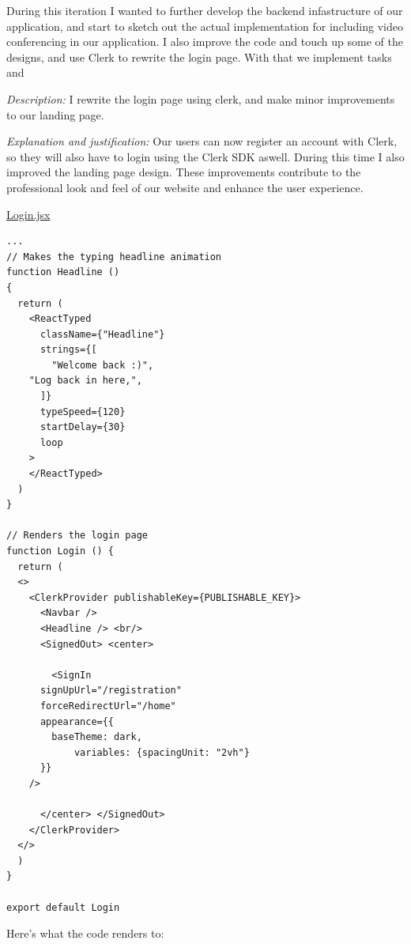 During this iteration I wanted to further develop the backend
infastructure of our application, and start to sketch out the
actual implementation for including video conferencing in our
application. I also improve the code and touch up some of the
designs, and use Clerk to rewrite the login page. With that
we implement tasks  and  \\ \vspace{0.2cm}

\textit{Description:} I rewrite the login page using clerk,
and make minor improvements to our landing page. \\
\vspace{0.2cm}

\textit{Explanation and justification:} Our users can now
register an account with Clerk, so they will also have to
login using the Clerk SDK aswell. During this time I also
improved the landing page design. These improvements
contribute to the professional look and feel of our website
and enhance the user experience. \\ \vspace{0.2cm}

\underline{Login.jsx}

\begin{verbatim}
...
// Makes the typing headline animation
function Headline ()
{
  return (
    <ReactTyped
      className={"Headline"}
      strings={[
        "Welcome back :)",
	"Log back in here,",
      ]}
      typeSpeed={120}
      startDelay={30}
      loop
    >
    </ReactTyped>
  )
}

// Renders the login page
function Login () {
  return (
  <>
    <ClerkProvider publishableKey={PUBLISHABLE_KEY}>
      <Navbar />
      <Headline /> <br/>
      <SignedOut> <center>

        <SignIn
	  signUpUrl="/registration"
	  forceRedirectUrl="/home"
	  appearance={{
	    baseTheme: dark,
            variables: {spacingUnit: "2vh"}
	  }}
	/>

      </center> </SignedOut>
    </ClerkProvider>
  </>
  )
}

export default Login
\end{verbatim}

Here's what the code renders to: \\

